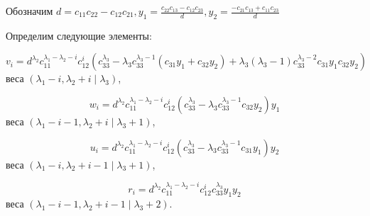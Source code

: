 Обозначим $d = c_{11} c_{22} - c_{12} c_{21}, y_1 = \frac{c_{22} c_{13} - c_{12} c_{23}}{d}, y_2 = \frac{-c_{21} c_{13} + c_{11} c_{23}}{d}$

Определим следующие элементы:

$$ v_i = d^{\lambda_2} c_{11}^{\lambda_1 - \lambda_2 - i} c_{12}^i (c_{33}^{\lambda_3} - \lambda_3 c_{33}^{\lambda_3 - 1} (c_{31} y_1 + c_{32} y_2) + \lambda_3 (\lambda_3 - 1) c_{33}^{\lambda_3 - 2} c_{31} y_1 c_{32} y_2) $$ 
веса $(\lambda_1 - i, \lambda_2 + i\mid\lambda_3)$,

$$ w_i = d^{\lambda_2} c_{11}^{\lambda_1 - \lambda_2 - i} c_{12}^i (c_{33}^{\lambda_3} - \lambda_3 c_{33}^{\lambda_3 - 1} c_{32} y_2) y_1 $$ 
веса $(\lambda_1 - i - 1, \lambda_2 + i\mid\lambda_3 + 1)$,

$$ u_i = d^{\lambda_2} c_{11}^{\lambda_1 - \lambda_2 - i} c_{12}^i (c_{33}^{\lambda_3} - \lambda_3 c_{33}^{\lambda_3 - 1} c_{31} y_1) y_2 $$ 
веса $(\lambda_1 - i, \lambda_2 + i - 1\mid\lambda_3 + 1)$,

$$ r_i = d^{\lambda_2} c_{11}^{\lambda_1 - \lambda_2 - i} c_{12}^i c_{33}^{\lambda_3} y_1 y_2 $$ 
веса $(\lambda_1 - i - 1, \lambda_2 + i - 1\mid\lambda_3 + 2)$.